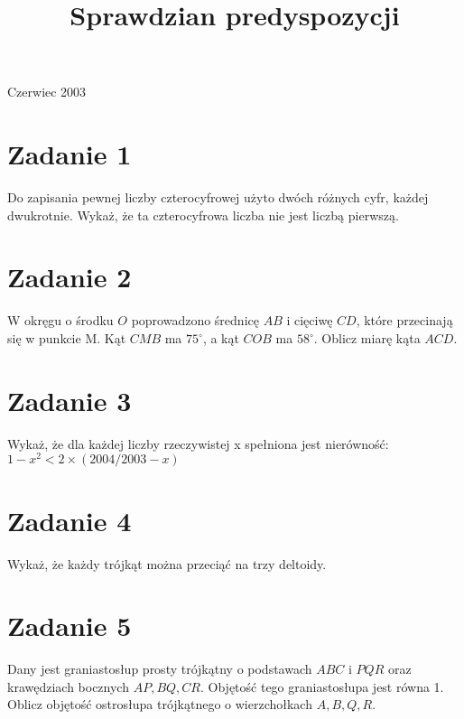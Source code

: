\documentclass[10pt]{article}
\title{Sprawdzian predyspozycji }
\author{}
\date{}
\begin{document}
\maketitle
Czerwiec 2003

\section*{Zadanie 1}
Do zapisania pewnej liczby czterocyfrowej użyto dwóch różnych cyfr, każdej dwukrotnie. Wykaż, że ta czterocyfrowa liczba nie jest liczbą pierwszą.

\section*{Zadanie 2}
W okręgu o środku \(O\) poprowadzono średnicę \(A B\) i cięciwę \(C D\), które przecinają się w punkcie M. Kąt \(C M B\) ma \(75^{\circ}\), a kąt \(C O B\) ma \(58^{\circ}\). Oblicz miarę kąta \(A C D\).

\section*{Zadanie 3}
Wykaż, że dla każdej liczby rzeczywistej x spełniona jest nierówność:\\
\(1-x^{2}<2 \times(2004 / 2003-x)\)

\section*{Zadanie 4}
Wykaż, że każdy trójkąt można przeciąć na trzy deltoidy.

\section*{Zadanie 5}
Dany jest graniastosłup prosty trójkątny o podstawach \(A B C\) i \(P Q R\) oraz krawędziach bocznych \(A P, B Q, C R\). Objętość tego graniastosłupa jest równa 1. Oblicz objętość ostrosłupa trójkątnego o wierzchołkach \(A, B, Q, R\).
\end{document}
